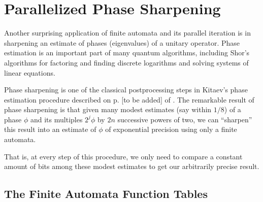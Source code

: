 \section{Parallelized Phase Sharpening}
\label{sec:sharp}

Another surprising application of finite automata and its parallel
iteration is in sharpening an estimate of phases (eigenvalues) of
a unitary operator.
Phase estimation is an important part of
many quantum algorithms, including Shor's algorithms for factoring and
finding discrete logarithms and solving systems of linear equations.

Phase sharpening is one of the classical postprocessing steps in Kitaev's
phase estimation procedure described on p. [to be added] of \cite{ksv02}.
The remarkable result of phase sharpening is that given many modest
estimates (say within $1/8$) of a phase $\phi$ and its multiples $2^{j}\phi$
by $2n$ successive powers of two, we can ``sharpen'' this result into
an estimate of $\phi$ of exponential precision using only a finite automata.

That is, at every step of this procedure, we only need to compare a
constant amount of bits among these modest estimates to get our
arbitrarily precise result.

\subsection{The Finite Automata Function Tables}


